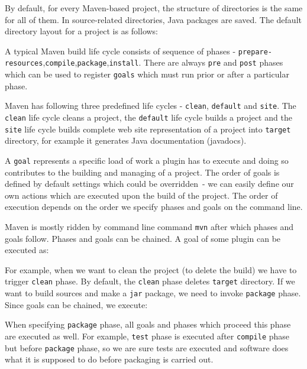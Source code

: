 \documentclass[12pt,final,oneside]{fithesis}
\begin{document}
By default, for every Maven-based project, the structure of directories is the same for all of them. 
In source-related directories, Java packages are saved. The default directory layout for a project is as follows:
\newpage


A typical Maven build life cycle consists of sequence of phases - \texttt{prepare-resources},\texttt{compile},\texttt{package},\texttt{install}. There are always \texttt{pre} and \texttt{post} phases which can be used to register \texttt{goals} which must run prior or after a particular phase.

Maven has following three predefined life cycles - \texttt{clean}, \texttt{default} and \texttt{site}\cite{bib020}. The \texttt{clean} life cycle cleans a project, the \texttt{default} life cycle builds a project and the \texttt{site} life cycle builds complete web site representation of a project into \texttt{target} directory, for example it generates Java documentation (javadocs).

A \texttt{goal} represents a specific load of work a plugin has to execute and doing so contributes to the building and managing of a project. The order of goals is defined by default settings which could be overridden~- we can easily define our own actions which are executed upon the build of the project. The order of execution depends on the order we specify phases and goals on the command line.

Maven is mostly ridden by command line command \texttt{mvn} \cite{bib021} after which phases and goals follow. Phases and goals can be chained. A goal of some plugin can be executed as:



For example, when we want to clean the project (to delete the build) we have to trigger \texttt{clean} phase. By default, the \texttt{clean} phase deletes \texttt{target} directory. If we want to build sources and make a \texttt{jar} package, we need to invoke \texttt{package} phase. Since goals can be chained, we execute:



When specifying \texttt{package} phase, all goals and phases which proceed this phase are executed as well. For example, \texttt{test} phase is executed after \texttt{compile} phase but before \texttt{package} phase, so we are sure tests are executed and software does what it is supposed to do before packaging is carried out.
\end{document}
